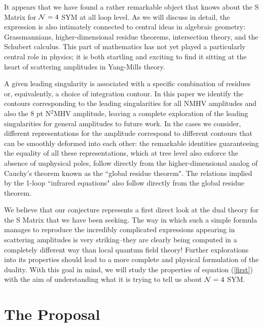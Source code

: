 \documentclass[12pt]{article}
\begin{document}
It appears that we have found a rather remarkable object that knows about the S Matrix for ${\cal N} = 4$ SYM at all loop level. As we will discuss in detail, the expression is also intimately connected to central ideas in algebraic geometry: Grassmannians, higher-dimensional residue theorems, intersection theory, and the Schubert calculus. This part of mathematics has not yet played a particularly central role in physics; it is both startling and exciting to find it sitting at the heart of scattering amplitudes in Yang-Mills theory. 

A given leading singularity is associated with a specific combination of residues or, equivalently, a choice of integration contour. In this paper we identify the contours corresponding to the leading singularities for all NMHV amplitudes and also the 8 pt N$^2$MHV amplitude, leaving a complete exploration of the leading singularities for general amplitudes to future work. 
In the cases we consider, different representations for the amplitude correspond to different contours that can be smoothly deformed into each other: the remarkable identities guaranteeing the equality of all these representations, which at tree level also enforce the absence of unphysical poles, follow directly from the higher-dimensional analog of Cauchy's theorem known as the ``global residue theorem". The relations implied by the 1-loop ``infrared equations" also follow directly from the global residue theorem.

We believe that our conjecture represents a first direct look at the dual theory for the S Matrix that we have been seeking. 
The way in which such a simple formula manages to reproduce the incredibly complicated expressions appearing in scattering amplitudes is very striking--they are clearly being computed in a completely different way than local quantum field theory!
Further explorations into its properties should lead to a more complete and physical formulation of the duality.
With this goal in mind, we will study the properties of equation (\ref{first}) with the aim of understanding what it is trying to tell us about ${\cal N} = 4$ SYM.


\section{The Proposal}
\end{document}
